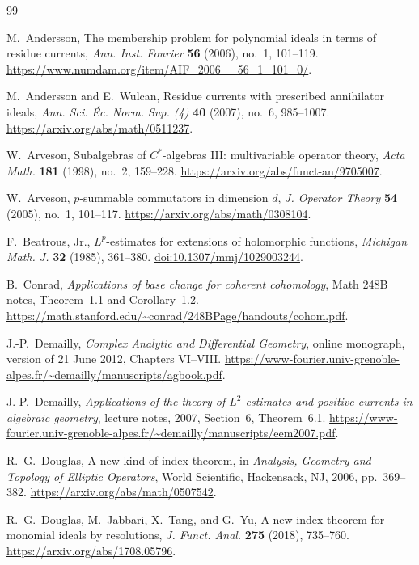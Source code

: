 \documentclass[11pt,reqno]{amsart}
\numberwithin{equation}{section}
\theoremstyle{definition}
\theoremstyle{remark}
\begin{document}

\raggedbottom
\begin{thebibliography}{99}

M.~Andersson, The membership problem for polynomial ideals in terms of
residue currents, \emph{Ann. Inst. Fourier} \textbf{56} (2006), no.~1,
101--119. \url{https://www.numdam.org/item/AIF_2006__56_1_101_0/}.

M.~Andersson and E.~Wulcan, Residue currents with prescribed annihilator
ideals, \emph{Ann. Sci. \'Ec. Norm. Sup. (4)} \textbf{40} (2007), no.~6,
985--1007. \url{https://arxiv.org/abs/math/0511237}.

W.~Arveson, Subalgebras of $C^*$-algebras III: multivariable operator
theory, \emph{Acta Math.} \textbf{181} (1998), no.~2, 159--228.
\url{https://arxiv.org/abs/funct-an/9705007}.

W.~Arveson, $p$-summable commutators in dimension $d$,
\emph{J. Operator Theory} \textbf{54} (2005), no.~1, 101--117.
\url{https://arxiv.org/abs/math/0308104}.

F.~Beatrous, Jr., $L^p$-estimates for extensions of holomorphic functions,
\emph{Michigan Math. J.} \textbf{32} (1985), 361--380.
\href{https://doi.org/10.1307/mmj/1029003244}{doi:10.1307/mmj/1029003244}.

B.~Conrad, \emph{Applications of base change for coherent cohomology},
Math 248B notes, Theorem~1.1 and Corollary~1.2.
\url{https://math.stanford.edu/~conrad/248BPage/handouts/cohom.pdf}.

J.-P.~Demailly, \emph{Complex Analytic and Differential Geometry},
online monograph, version of 21 June 2012, Chapters VI--VIII.
\url{https://www-fourier.univ-grenoble-alpes.fr/~demailly/manuscripts/agbook.pdf}.

J.-P.~Demailly, \emph{Applications of the theory of $L^2$ estimates and
positive currents in algebraic geometry}, lecture notes, 2007,
Section~6, Theorem~6.1.
\url{https://www-fourier.univ-grenoble-alpes.fr/~demailly/manuscripts/eem2007.pdf}.

R.~G.~Douglas, A new kind of index theorem, in
\emph{Analysis, Geometry and Topology of Elliptic Operators},
World Scientific, Hackensack, NJ, 2006, pp.~369--382.
\url{https://arxiv.org/abs/math/0507542}.

R.~G.~Douglas, M.~Jabbari, X.~Tang, and G.~Yu, A new index theorem for
monomial ideals by resolutions, \emph{J. Funct. Anal.} \textbf{275}
(2018), 735--760. \url{https://arxiv.org/abs/1708.05796}.


\end{thebibliography}
\end{document}
